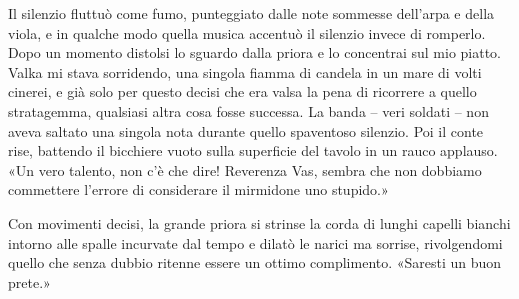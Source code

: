Il silenzio fluttuò come fumo, punteggiato dalle note sommesse dell'arpa
e della viola, e in qualche modo quella musica accentuò il silenzio
invece di romperlo. Dopo un momento distolsi lo sguardo dalla priora e
lo concentrai sul mio piatto. Valka mi stava sorridendo, una singola
fiamma di candela in un mare di volti cinerei, e già solo per questo
decisi che era valsa la pena di ricorrere a quello stratagemma,
qualsiasi altra cosa fosse successa. La banda -- veri soldati -- non
aveva saltato una singola nota durante quello spaventoso silenzio. Poi
il conte rise, battendo il bicchiere vuoto sulla superficie del tavolo
in un rauco applauso. «Un vero talento, non c'è che dire! Reverenza Vas,
sembra che non dobbiamo commettere l'errore di considerare il mirmidone
uno stupido.»

Con movimenti decisi, la grande priora si strinse la corda di lunghi
capelli bianchi intorno alle spalle incurvate dal tempo e dilatò le
narici ma sorrise, rivolgendomi quello che senza dubbio ritenne essere
un ottimo complimento. «Saresti un buon prete.»


